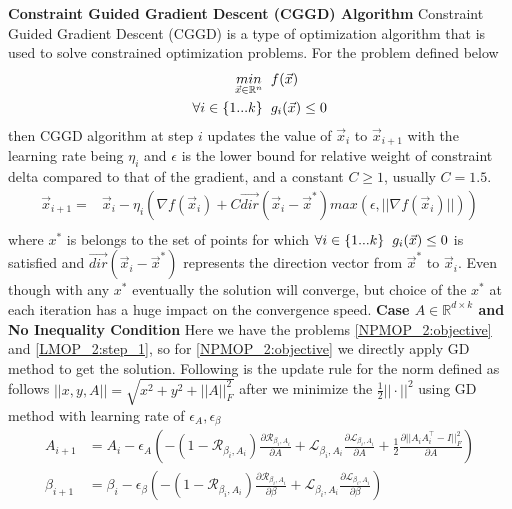 \newline \textbf{Constraint Guided Gradient Descent (CGGD) Algorithm}
\newline Constraint Guided Gradient Descent (CGGD) is a type of optimization algorithm that is used to solve constrained optimization problems. For the problem defined  below 
\begin{equation}
\begin{aligned}
    \underset{\vec{x} \in \mathbb{R}^n}{min} \hspace{2mm} & f(\vec{x})\\
    \forall i \in \{1...k\} \hspace{2mm} & g_i(\vec{x}) \le 0\\
\end{aligned}
\end{equation}
then CGGD algorithm at step $i$ updates the value of $\vec{x}_i$ to $\vec{x}_{i+1}$ with the learning rate being $\eta_i$ and $\epsilon$ is the lower bound for relative weight of constraint delta compared to that of the gradient, and a constant $C\ge 1$, usually $C = 1.5$.
\begin{equation}
\begin{aligned}
    \vec{x}_{i+1} =& \vec{x}_i - \eta_i(\nabla f(\vec{x}_i) + C \vec{dir}(\vec{x}_i-\vec{x}^{*}) max(\epsilon,||\nabla f(\vec{x}_i)||))\\
\end{aligned}
\end{equation}
where $x^{*}$ is belongs to the set of points for which $\forall i \in \{1...k\} \hspace{2mm}  g_i(\vec{x}) \le 0$ is satisfied and $\vec{dir}(\vec{x}_i-\vec{x}^{*})$ represents the direction vector from $\vec{x}^{*}$ to $\vec{x}_i$. Even though with any $x^{*}$ eventually the solution will converge, but choice of the $x^{*}$ at each iteration has a huge impact on the convergence speed. 
\newline \newline \textbf{Case $A \in \mathbb{R}^{d \times k}$ and No Inequality Condition}
\newline Here we have the problems \ref{NPMOP_2:objective} and \ref{LMOP_2:step_1}, so for \ref{NPMOP_2:objective} we directly apply GD method to get the solution. Following is the update rule for the norm defined as follows $||x,y,A|| = \sqrt{x^2+y^2+||A||^2_F}$ after we minimize the $\frac{1}{2}||\cdot||^2$ using GD method with learning rate of $\epsilon_A,\epsilon_{\beta}$
\begin{equation}
\begin{aligned}
A_{i+1} &= A_{i} - \epsilon_A ( -(1-\mathcal{R}_{\beta_i, A_i})\frac{\partial \mathcal{R}_{\beta_i, A_i}}{\partial A} + \mathcal{L}_{\beta_i, A_i} \frac{\partial \mathcal{L}_{\beta_i, A_i}}{\partial A}+ \frac{1}{2}\frac{\partial ||A_iA^\top_i -I||^2_F}{\partial A} )\\
\beta_{i+1} &= \beta_{i} - \epsilon_{\beta} ( -(1-\mathcal{R}_{\beta_i, A_i})\frac{\partial \mathcal{R}_{\beta_i, A_i}}{\partial \beta} + \mathcal{L}_{\beta_i, A_i} \frac{\partial \mathcal{L}_{\beta_i, A_i}}{\partial \beta} )\\
\end{aligned}    
\end{equation}

